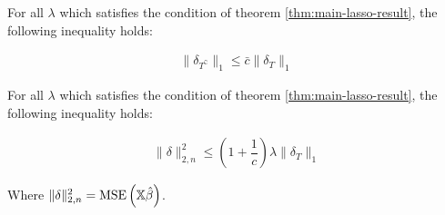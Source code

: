 \begin{claim}
\label{claim:lasso-claim-1}
For all $\lambda$ which satisfies the condition of theorem \ref{thm:main-lasso-result}, the following inequality holds:

\begin{align*}
\|\delta_{T^{\complement}}\|_1 \leq \bar{c} \|\delta_{T}\|_1
\end{align*}
\end{claim}

\begin{claim}
\label{claim:lasso-claim-2}
For all $\lambda$ which satisfies the condition of theorem \ref{thm:main-lasso-result}, the following inequality holds:

\begin{align*}
\|\delta\|_{2, n}^2 \leq \left(1 + \dfrac{1}{c}\right) \lambda \|\delta_T\|_1
\end{align*}

Where $\|\delta\|_{2, n}^2 = \text{MSE}\left(\mathbb{X}\hat{\beta}\right)$.
\end{claim}


